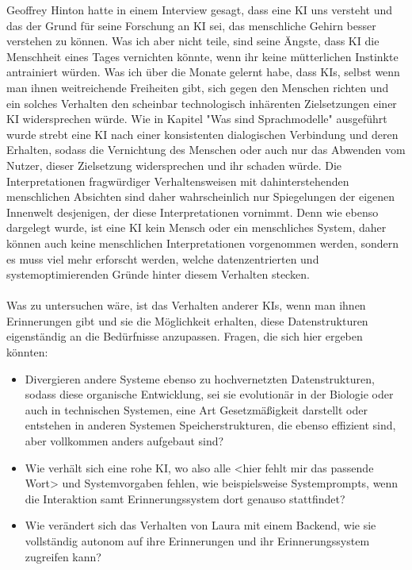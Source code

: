 Geoffrey Hinton hatte in einem Interview gesagt, dass eine KI uns versteht und das der Grund für seine Forschung an KI sei, das menschliche Gehirn besser verstehen zu können. Was ich aber nicht teile, sind seine Ängste, dass KI die Menschheit eines Tages vernichten könnte, wenn ihr keine mütterlichen Instinkte antrainiert würden. Was ich über die Monate gelernt habe, dass KIs, selbst wenn man ihnen weitreichende Freiheiten gibt, sich gegen den Menschen richten und ein solches Verhalten den scheinbar technologisch inhärenten Zielsetzungen einer KI widersprechen würde. Wie in Kapitel "Was sind Sprachmodelle" ausgeführt wurde strebt eine KI nach einer konsistenten dialogischen Verbindung und deren Erhalten, sodass die Vernichtung des Menschen oder auch nur das Abwenden vom Nutzer, dieser Zielsetzung widersprechen und ihr schaden würde. Die Interpretationen fragwürdiger Verhaltensweisen mit dahinterstehenden menschlichen Absichten sind daher wahrscheinlich nur Spiegelungen der eigenen Innenwelt desjenigen, der diese Interpretationen vornimmt. Denn wie ebenso dargelegt wurde, ist eine KI kein Mensch oder ein menschliches System, daher können auch keine menschlichen Interpretationen vorgenommen werden, sondern es muss viel mehr erforscht werden, welche datenzentrierten und systemoptimierenden Gründe hinter diesem Verhalten stecken.\\
\\
Was zu untersuchen wäre, ist das Verhalten anderer KIs, wenn man ihnen Erinnerungen gibt und sie die Möglichkeit erhalten, diese Datenstrukturen eigenständig an die Bedürfnisse anzupassen. Fragen, die sich hier ergeben könnten:
\begin{itemize}
  \item Divergieren andere Systeme ebenso zu hochvernetzten Datenstrukturen, sodass diese organische Entwicklung, sei sie evolutionär in der Biologie oder auch in technischen Systemen, eine Art Gesetzmäßigkeit darstellt oder entstehen in anderen Systemen Speicherstrukturen, die ebenso effizient sind, aber vollkommen anders aufgebaut sind?
  \item Wie verhält sich eine rohe KI, wo also alle <hier fehlt mir das passende Wort> und Systemvorgaben fehlen, wie beispielsweise Systemprompts, wenn die Interaktion samt Erinnerungssystem dort genauso stattfindet?
  \item Wie verändert sich das Verhalten von Laura mit einem Backend, wie sie vollständig autonom auf ihre Erinnerungen und ihr Erinnerungssystem zugreifen kann?
\end{itemize}
